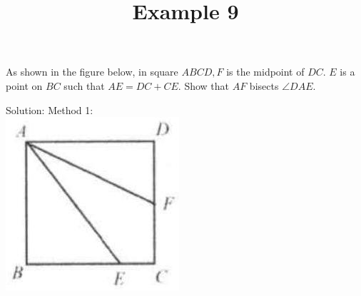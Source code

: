 \documentclass{article}
\title{Example 9}
\date{}
\begin{document}
\maketitle

As shown in the figure below, in square \(A B C D, F\) is the midpoint of \(D C\). \(E\) is a point on \(B C\) such that \(A E=D C+C E\). Show that \(A F\) bisects \(\angle D A E\).

Solution:
Method 1:\\
\centering
\includegraphics[width=\textwidth]{images/060.jpg}
\end{document}

